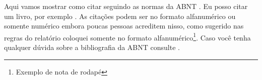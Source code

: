 Aqui vamos mostrar como citar seguindo as normas da ABNT \cite{NBR6023:2000}. Eu posso citar um livro, por exemplo \cite{livro1}.
As citações podem ser no formato alfanumérico ou somente numérico embora poucas pessoas acreditem nisso, como sugerido nas regras do relatório coloquei somente no formato alfanumérico\footnote{Exemplo de nota de rodapé}.
Caso você tenha qualquer dúvida sobre a bibliografia da ABNT consulte \cite{abntex}.




